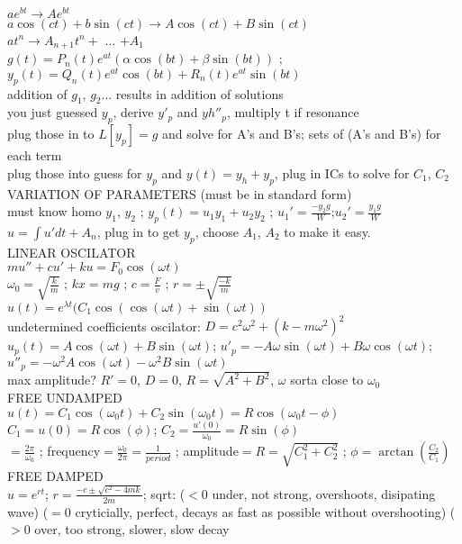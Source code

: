 \documentclass{article}
\begin{document}
\begin{large}
\\$ae^{bt} \rightarrow Ae^{bt}$
\\$a\cos(ct)+b\sin(ct) \rightarrow A\cos(ct)+B\sin(ct)$
\\$at^n \rightarrow A_{n+1}t^n+$ ... $+A_1$
\\$g(t)=P_n(t)e^{at}(\alpha\cos(bt)+\beta\sin(bt))$ ; $y_p(t)=Q_n(t)e^{at}\cos(bt)+R_n(t)e^{at}\sin(bt)$
\\addition of $g_1$, $g_2$... results in addition of solutions
\\you just guessed $y_p$, derive $y'_p$ and $yh''_p$, multiply t if resonance
\\plug those in to $L[y_p]=g$ and solve for A's and B's; sets of (A's and B's) for each term
\\plug those into guess for $y_p$ and $y(t)=y_h+y_p$, plug in ICs to solve for $C_1$, $C_2$
\\VARIATION OF PARAMETERS (must be in standard form)
\\must know homo $y_1$, $y_2$ ;  $y_p(t)=u_1y_1+u_2y_2$ ;  $u_1'=\frac{-y_2g}{W}$;$u_2'=\frac{y_1g}{W}$
\\$u=\int u' dt + A_n$, plug in to get $y_p$, choose $A_1$, $A_2$ to make it easy.
\\LINEAR OSCILATOR
\\$mu''+cu'+ku=F_0\cos(\omega t)$
\\$\omega_0=\sqrt{\frac{k}{m}}$ ;  $kx=mg$ ;  $c=\frac{F}{v}$ ;  $r=\pm\sqrt{\frac{-k}{m}}$
\\$u(t)=e^{\lambda t}(C_1\cos(\cos(\omega t)+\sin(\omega t))$
\\undetermined coefficients oscilator: $D=c^2\omega^2+(k-m\omega^2)^2$
\\$u_p(t)=A\cos(\omega t)+B\sin(\omega t)$; $u'_p=-A\omega\sin(\omega t)+B\omega\cos(\omega t)$; $u''_p=-\omega^2A\cos(\omega t)-\omega^2B\sin(\omega t)$
\\max amplitude? $R'=0$, $D=0$, $R=\sqrt{A^2+B^2}$, $\omega$ sorta close to $\omega_0$
\\FREE UNDAMPED
\\$u(t)=C_1\cos(\omega_0 t)+C_2\sin(\omega_0 t)=R\cos(\omega_0 t-\phi)$
\\$C_1=u(0)=R\cos(\phi)$; $C_2=\frac{u'(0)}{\omega_0}=R\sin(\phi)$
\\$=\frac{2\pi}{\omega_0}$ ;  frequency$=\frac{\omega_0}{2\pi}=\frac{1}{period}$ ;  amplitude$=R=\sqrt{C_1^2+C_2^2}$ ;  $\phi=\arctan(\frac{C_2}{C_1})$
\\FREE DAMPED
\\$u=e^{rt}$; $r=\frac{-c\pm\sqrt{c^2-4mk}}{2m}$; sqrt: ($<0$ under, not strong, overshoots, disipating wave) ($=0$ cryticially, perfect, decays as fast as possible without overshooting) ($>0$ over, too strong, slower, slow decay

\end{large}
\end{document}
